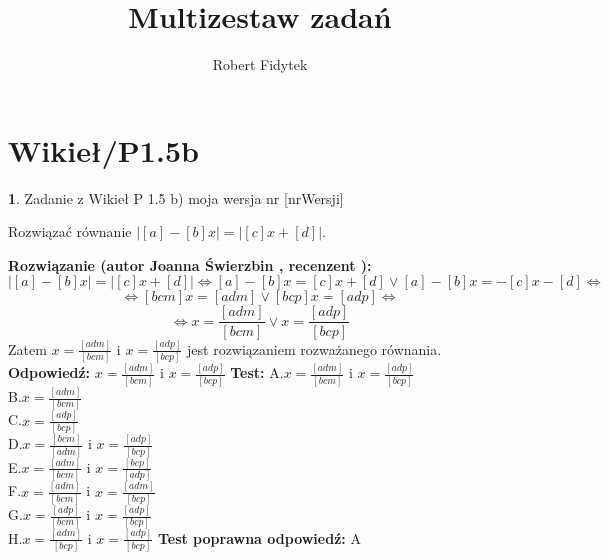 \documentclass[12pt, a4paper]{article}
\title{Multizestaw zadań}
\author{Robert Fidytek}
\date{}
\theoremstyle{definition} %
\newtheorem{zad}{}
\newcommand{\kategoria}[1]{\section{#1}} %
\newcommand{\zadStart}[1]{\begin{zad}#1\newline} %
\newcommand{\zadStop}{\end{zad}}   %
\newcommand{\rozwStart}[2]{\noindent \textbf{Rozwiązanie (autor #1 , recenzent #2): }\newline} %
\newcommand{\rozwStop}{\newline}                                            %
\newcommand{\odpStart}{\noindent \textbf{Odpowiedź:}\newline}    %
\newcommand{\odpStop}{\newline}                                             %
\newcommand{\testStart}{\noindent \textbf{Test:}\newline} %
\newcommand{\testStop}{\newline} %
\newcommand{\kluczStart}{\noindent \textbf{Test poprawna odpowiedź:}\newline} %
\newcommand{\kluczStop}{\newline} %
\begin{document}
\maketitle


\kategoria{Wikieł/P1.5b}
\zadStart{Zadanie z Wikieł P 1.5 b) moja wersja nr [nrWersji]}


Rozwiązać równanie  $|{[a]-[b]x}| = |{[c]x+[d]}|$.
\zadStop
\rozwStart{Joanna Świerzbin}{}
$$|{[a]-[b]x}| = |{[c]x+[d]}| \Leftrightarrow {[a]-[b]x} = {[c]x+[d]} \vee {[a]-[b]x} = {-[c]x-[d]}  \Leftrightarrow$$
$$\Leftrightarrow {[bcm]x} = {[adm]} \vee {[bcp]x} = {[adp]}  \Leftrightarrow$$
$$\Leftrightarrow {x} = {\frac{[adm]}{[bcm]}} \vee {x} = {\frac{[adp]}{[bcp]}} $$
Zatem $ {x} = {\frac{[adm]}{[bcm]}} $ i ${x} = {\frac{[adp]}{[bcp]}} $ jest rozwiązaniem rozważanego równania.
\rozwStop
\odpStart
$ {x} = {\frac{[adm]}{[bcm]}} $ i ${x} = {\frac{[adp]}{[bcp]}} $
\odpStop
\testStart
A.$ {x} = {\frac{[adm]}{[bcm]}} $ i ${x} = {\frac{[adp]}{[bcp]}} $\\
B.$ {x} = {\frac{[adm]}{[bcm]}} $ \\
C.$ {x} = {\frac{[adp]}{[bcp]}} $ \\
D.$ {x} = {\frac{[bcm]}{[adm]}} $ i ${x} = {\frac{[adp]}{[bcp]}} $\\
E.$ {x} = {\frac{[adm]}{[bcm]}} $ i ${x} = {\frac{[bcp]}{[adp]}} $\\
F.$ {x} = {\frac{[adm]}{[bcm]}} $ i ${x} = {\frac{[adm]}{[bcp]}} $ \\
G.$ {x} = {\frac{[adp]}{[bcm]}} $ i ${x} = {\frac{[adp]}{[bcp]}} $\\
H.$ {x} = {\frac{[adm]}{[bcp]}} $ i ${x} = {\frac{[adp]}{[bcp]}} $
\testStop
\kluczStart
A
\kluczStop
\end{document}
